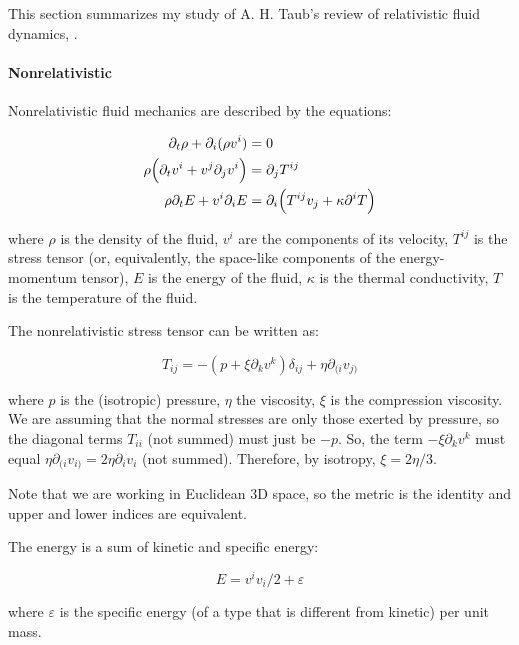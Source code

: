 \documentclass[main.tex]{subfiles}
\begin{document}
This section summarizes my study of A. H. Taub's review of relativistic fluid dynamics, \cite{Taub:1978}.

\paragraph{Nonrelativistic}

Nonrelativistic fluid mechanics are described by the equations:

\begin{subequations}
\begin{align}
    \partial_t \rho + \partial_i (\rho v^i) &= 0 \\
    \rho \qty(\partial_t v^i + v^j \partial_j v^i) &= \partial_j T^{ij} \\
    \rho \partial_t E + v^i \partial_i E &= \partial_i \qty(T^{ij}v_j + \kappa\partial^i T)
\end{align}
\end{subequations}

where $\rho$ is the density of the fluid,
$v^i$ are the components of its velocity,
$T^{ij}$ is the stress tensor (or, equivalently, the space-like components of the energy-momentum tensor),
$E$ is the energy of the fluid,
$\kappa$ is the thermal conductivity,
$T$ is the temperature of the fluid.

The nonrelativistic stress tensor can be written as:

\begin{equation}
    T_{ij} = -(p + \xi \partial_k v^k ) \delta_{ij} + \eta \partial_{(i} v_{j)}
\end{equation}

where $p$ is the (isotropic) pressure, $\eta$ the viscosity, $\xi$ is the compression viscosity. We are assuming that the normal stresses are only those exerted by pressure, so the diagonal terms $T_{ii}$ (not summed) must just be $-p$. So, the term $-\xi \partial_k v^k$ must equal $\eta \partial_{(i} v_{i)} = 2\eta \partial_i v_i$ (not summed). Therefore, by isotropy, $\xi = 2\eta/3$.

Note that we are working in Euclidean 3D space, so the metric is the identity and upper and lower indices are equivalent.

The energy is a sum of kinetic and specific energy:

\begin{equation}
    E = v^i v_i /2 + \varepsilon
\end{equation}

where $\varepsilon$ is the specific energy (of a type that is different from kinetic) per unit mass.
\end{document}
